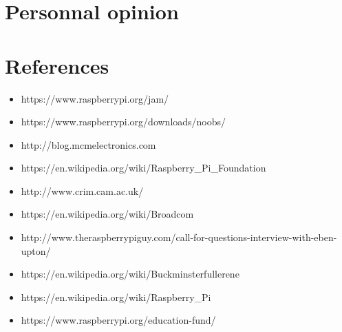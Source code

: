 \documentclass[10pt,a4paper]{article}
\begin{document}
\section{Personnal opinion}

\paragraph{}

\paragraph{}

\section{References}

\begin{itemize}
\item https://www.raspberrypi.org/jam/
\item https://www.raspberrypi.org/downloads/noobs/
\item http://blog.mcmelectronics.com
\item https://en.wikipedia.org/wiki/Raspberry\_Pi\_Foundation
\item http://www.crim.cam.ac.uk/
\item https://en.wikipedia.org/wiki/Broadcom
\item http://www.theraspberrypiguy.com/call-for-questions-interview-with-eben-upton/
\item https://en.wikipedia.org/wiki/Buckminsterfullerene
\item https://en.wikipedia.org/wiki/Raspberry\_Pi
\item https://www.raspberrypi.org/education-fund/

\end{itemize}
\end{document}
